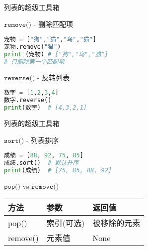 \documentclass{beamer}
\begin{document}
\begin{frame}[fragile]{列表的超级工具箱}

\begin{block}{$\texttt{remove()}$ - 删除匹配项}
\begin{lstlisting}[language=Python]
宠物 = ["狗","猫","鸟","猫"]
宠物.remove("猫")  
print (宠物) # ["狗","鸟","猫"]
# 只删除第一个匹配项
\end{lstlisting}
\end{block}

\begin{block}{$\texttt{reverse()}$ - 反转列表}
\begin{lstlisting}[language=Python]
数字 = [1,2,3,4]
数字.reverse()
print(数字)  # [4,3,2,1]
\end{lstlisting}
\end{block}

\end{frame}

\begin{frame}[fragile]{列表的超级工具箱}

\begin{block}{$\texttt{sort()}$ - 列表排序}
\begin{lstlisting}[language=Python]
成绩 = [88, 92, 75, 85]
成绩.sort()  # 默认升序
print(成绩)  # [75, 85, 88, 92]
\end{lstlisting}
\end{block}

\begin{block}{$\texttt{pop()}$ vs $\texttt{remove()}$}
\begin{tabular}{|l|l|l|}
\hline
\textcolor{cuhksz1}{方法} & \textcolor{cuhksz1}{参数} & \textcolor{cuhksz1}{返回值} \\ \hline
pop() & 索引(可选) & 被移除的元素 \\ \hline
remove() & 元素值 & None \\ \hline
\end{tabular}
\end{block}
\end{frame}
\end{document}
